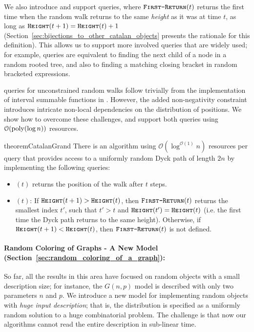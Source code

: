 We also introduce and support  queries, where $\texttt{\textsc{First-Return}}(t)$ returns
the first time when the random walk returns to the same \emph{height} as it was at time $t$, as long as $\texttt{\textsc{Height}}(t+1)=\texttt{\textsc{Height}}(t)+1$
(Section~\ref{sec:bijections_to_other_catalan_objects} presents the rationale for this definition).
This allows us to support more involved queries that are widely used;
for example,  queries are equivalent to finding the next child of a node in a random rooted tree,
and also to finding a matching closing bracket in random bracketed expressions.

 queries for unconstrained random walks follow trivially from the implementation of interval summable functions in \cite{huge, histogram}.
However, the added non-negativity constraint introduces intricate non-local dependencies on the distribution of positions.
We show how to overcome these challenges, and support both queries using $\mathcal O(\mathrm{poly}(\log n))$ resources.

\begin{restatable}{theorem}{CatalanGrand}
\label{thm:catalan_main}
There is an algorithm using $\mathcal O(\log^{\mathcal O(1)} n)$ resources per query that provides access to
a uniformly random Dyck path of length $2n$ by implementing the following queries:
\begin{itemize}
    \item {}$(t)$ returns the position of the walk after $t$ steps.
    \item {}$(t)$: If $\texttt{\textsc{Height}}(t+1) > \texttt{\textsc{Height}}(t)$, then $\texttt{\textsc{First-Return}}(t)$ returns the smallest index $t'$,
    such that $t'>t$ and $\texttt{\textsc{Height}}(t') = \texttt{\textsc{Height}}(t)$ (i.e. the first time the Dyck path returns to the same height).
    Otherwise, if $\texttt{\textsc{Height}}(t+1) < \texttt{\textsc{Height}}(t)$, then $\texttt{\textsc{First-Return}}(t)$ is not defined.
\end{itemize}
\end{restatable}




\paragraph*{Random Coloring of Graphs - A New Model (Section~\ref{sec:random_coloring_of_a_graph}):}%
\label{par:random_coloring_of_graphs}
So far, all the results in this area have focused on random objects with a small description size;
for instance, the $G(n, p)$ model is described with only two parameters $n$ and $p$.
We introduce a new model for implementing random objects with \emph{huge input description};
that is, the distribution is specified as a uniformly random solution to a huge combinatorial problem.
The challenge is that now our algorithms cannot read the entire description in sub-linear time.

